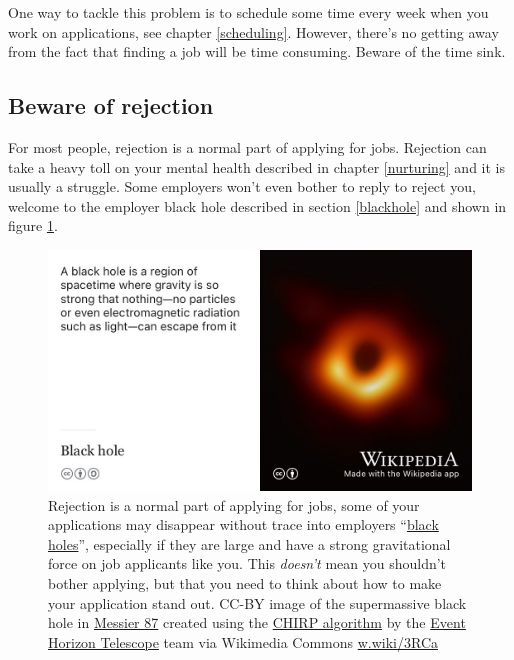 \documentclass[
]{book}
\begin{document}
One way to tackle this problem is to schedule some time every week when you work on applications, see chapter \ref{scheduling}. However, there's no getting away from the fact that finding a job will be time consuming. Beware of the time sink.

\hypertarget{rejection}{%
\subsection{Beware of rejection}\label{rejection}}

For most people, rejection is a normal part of applying for jobs. Rejection can take a heavy toll on your mental health described in chapter \ref{nurturing} and it is usually a struggle. Some employers won't even bother to reply to reject you, welcome to the employer black hole described in section \ref{blackhole} and shown in figure \ref{fig:blackhole-fig}.

\begin{figure}

{\centering \includegraphics[width=0.98\linewidth]{images/blackhole} 

}

\caption{Rejection is a normal part of applying for jobs, some of your applications may disappear without trace into employers ``\href{https://en.wikipedia.org/wiki/Black_hole}{black holes}'', especially if they are large and have a strong gravitational force on job applicants like you. This \emph{doesn't} mean you shouldn't bother applying, but that you need to think about how to make your application stand out. CC-BY image of the supermassive black hole in \href{https://en.wikipedia.org/wiki/Messier_87}{Messier 87} created using the \href{https://en.wikipedia.org/wiki/CHIRP_(algorithm)}{CHIRP algorithm} by the \href{https://en.wikipedia.org/wiki/Event_Horizon_Telescope}{Event Horizon Telescope} team via Wikimedia Commons \href{https://w.wiki/3RCa}{w.wiki/3RCa}}\label{fig:blackhole-fig}
\end{figure}
\end{document}
